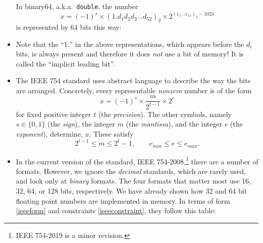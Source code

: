\documentclass[11pt]{amsart}
\begin{document}
\begin{itemize}
\noindent In binary64, a.k.a.~\texttt{double}, the number
       $$x = (-1)^s \times \left(1.d_1 d_2 d_3 \dots d_{52}\right)_{2} \times 2^{\left(e_1\dots e_{11}\right)_2 - 1023}$$
is represented by 64 bits this way:

\medskip

\item Note that the ``$1.$'' in the above representations, which appears before the $d_i$ bits, is always present and therefore it does \emph{not} use a bit of memory!  It is called the ``implicit leading bit''.

\item The IEEE 754 standard uses abstract language to describe the way the bits are arranged.  Concretely, every representable \emph{nonzero} number is of the form
\begin{equation}
x = (-1)^s \times \frac{m}{2^{t-1}} \times 2^e  \label{ieeeform}
\end{equation}
for fixed positive integer $t$ (the \emph{precision}).  The other symbols, namely $s\in\{0,1\}$ (the \emph{sign}), the integer $m$ (the \emph{mantissa}), and the integer $e$ (the \emph{exponent}), determine, $x$.  These satisfy
\begin{equation}
2^{t-1} \le m \le 2^t - 1, \qquad e_{min} \le e \le e_{max}.  \label{ieeeconstraint}
\end{equation}

\item In the current version of the standard, IEEE 754-2008,\footnote{IEEE 754-2019 is a minor revision.} there are a number of formats.  However, we ignore the \emph{decimal} standards, which are rarely used, and look only at \emph{binary} formats.  The four formats that matter most use 16, 32, 64, or 128 bits, respectively.  We have already shown how 32 and 64 bit floating point numbers are implemented in memory.  In terms of form \eqref{ieeeform} and constraints \eqref{ieeeconstraint}, they follow this table:


\end{itemize}
\end{document}
